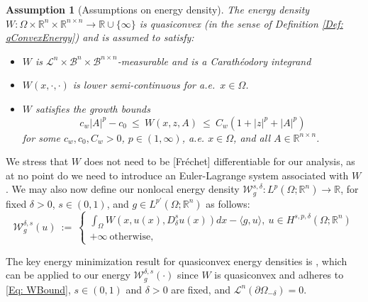 \documentclass[11pt, reqno]{amsart}   	%
\theoremstyle{plain}
\numberwithin{equation}{section}
\newtheorem{assumption}[thm]{Assumption}
\def\de{\delta}
\def\Om{\Omega}
\def\pa{\partial}
\def\R{\mathbb{R}}
\def\lang{\langle}
\def\rang{\rangle}
\def\Lin{\mathcal{L}}
\begin{document}
\begin{assumption}[Assumptions on energy density]
 \label{Assump: energyDensityAssump}
 The energy density $W: \Om \times \R^n \times \R^{n \times n} \to \R \cup \{ \infty \}$ is quasiconvex (in the sense of Definition \ref{Def: qConvexEnergy}) and is assumed to satisfy:
 \begin{itemize}
     \item $W$ is $\mathcal{L}^n \times \mathcal{B}^n \times \mathcal{B}^{n \times n}$-measurable and is a Carathéodory integrand %
\item $W (x, \cdot, \cdot)$ is lower semi-continuous for a.e.\ $x \in \Om$.
\item $W$ satisfies the growth bounds 
 \begin{equation} \label{Eq: WBound}
     c_w|A|^p - c_0 \ \leq \ W(x, z, A) \ \leq \ C_w(1 + |z|^p + |A|^p)
 \end{equation}
 for some $c_w, c_0, C_w > 0$, $p\in (1,\infty)$, a.e. $x \in \Om$, and all $A \in \R^{n \times n}$.%
 \end{itemize}
 \end{assumption}

 We stress that $W$ does not need to be [Fréchet] differentiable for our analysis, as at no point do we need to introduce an Euler-Lagrange system associated with $W$. We may also now define our nonlocal energy density $\mathcal{W}^{s, \de}_g: L^p(\Om; \R^n) \rightarrow \R$, for fixed $\de > 0$, $s\in (0,1)$, and $g \in L^{p'}(\Om; \R^n)$ as follows:
	\begin{equation}\label{Eq: NLEnergy}
		\mathcal{W}^{\de, s}_g(u) \ := \ \begin{cases}
			\int_{\Om}W(x, u(x), D^s_{\de}u(x))dx - \lang g, u\rang, \ u \in H^{s, p, \de}(\Om; \R^n) \\
			+\infty \ \text{otherwise},
		\end{cases}
	\end{equation}

The key energy minimization result for quasiconvex energy densities is \cite[Corollary 2]{cueto2023variational}, which can be applied to our energy $\mathcal{W}^{\de, s}_g(\cdot)$ since $W$ is quasiconvex and adheres to \eqref{Eq: WBound}, $s \in (0, 1)$ and $\de > 0$ are fixed, and $\Lin^n(\pa \Om_{-\de}) = 0$.
\end{document}
